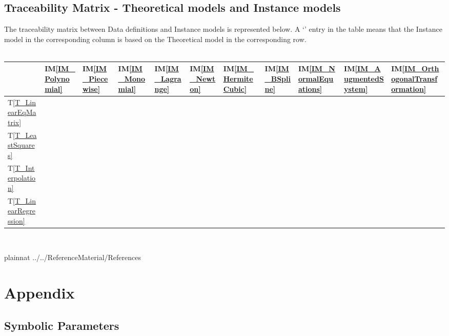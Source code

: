 \documentclass[12pt]{article}
\newcommand{\tref}[1]{T\ref{#1}}
\newcommand{\iref}[1]{IM\ref{#1}}
\begin{document}
\subsection{Traceability Matrix - Theoretical models and Instance models}
The traceability matrix between Data definitions and Instance models is represented below. A `\checkmark' entry in the table means that the Instance model in the corresponding column is based on the Theoretical model in the corresponding row.\\
~\newline
\begin{tabular}{|p{1.3cm}|p{1cm}|p{1cm}|p{1cm}|p{1cm}|p{1cm}|p{1cm}|p{1cm}|p{1cm}|p{1cm}|p{1cm}|}
	
	\hline
	&\iref{IM_Polynomial}  & \iref{IM_Piecewise} & \iref{IM_Monomial} & \iref{IM_Lagrange} & \iref{IM_Newton} & \iref{IM_HermiteCubic}  & \iref{IM_BSpline} & \iref{IM_NormalEquations} & \iref{IM_AugmentedSystem} & \iref{IM_OrthogonalTransformation}\\
	\hline
	\tref{T_LinearEqMatrix} &  &   & \checkmark  & \checkmark & \checkmark  & \checkmark    &  & \checkmark & \checkmark & \checkmark \\
	\hline
	\tref{T_LeastSquares} &  &   &   &   &   &    &  & \checkmark & \checkmark & \checkmark \\
	\hline
	\tref{T_Interpolation} & \checkmark & \checkmark  & \checkmark  & \checkmark  & \checkmark  & \checkmark   & \checkmark & & & \\
	\hline
	\tref{T_LinearRegression} &  &   &   &   &   &  &  & \checkmark & \checkmark & \checkmark  \\
	\hline
\end{tabular}\\


\newpage

 {plainnat}
 {../../ReferenceMaterial/References}

\newpage

\section{Appendix}



\subsection{Symbolic Parameters}
\end{document}
